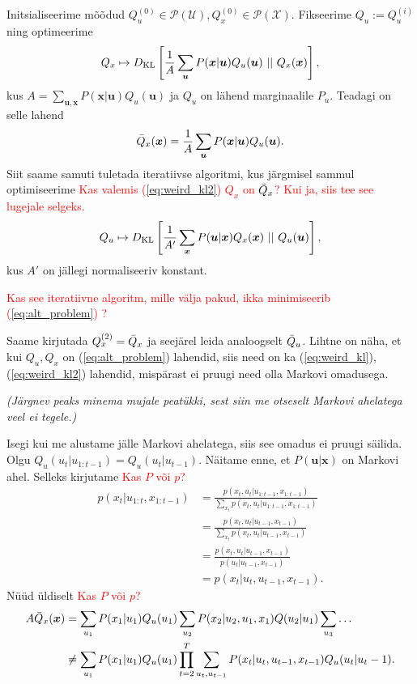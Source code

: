 Initsialiseerime mõõdud $Q_u^{(0)} \in \mathcal{P}(\mathcal{U}), Q_x^{(0)} \in \mathcal{P}(\mathcal{X})$. Fikseerime $Q_u := Q_u^{(i)}$ ning optimeerime \begin{equation}
    \label{eq:weird_kl}
    Q_x \mapsto D_{\mathrm{KL}}\left[\frac{1}{A}\sum_{\bm{u}} P(\bm{x} | \bm{u}) Q_u(\bm{u})\ ||\ Q_x(\bm{x})\right],
\end{equation}
kus $A = \sum_{\bm{u},\bm{x}} P(\bm{x}|\bm{u}) Q_u(\bm{u})$ ja $Q_u$ on lähend marginaalile $P_u$. Teadagi on selle lahend 
$$\Bar{Q}_x(\bm{x}) = \frac{1}{A}\sum_{\bm{u}} P(\bm{x}|\bm{u})Q_u(\bm{u}).$$ 
Siit saame samuti tuletada iteratiivse algoritmi, kus järgmisel sammul optimiseerime \textcolor{red}{Kas valemis (\ref{eq:weird_kl2}) $Q_x$ on $\Bar{Q}_x$? Kui ja, siis tee see lugejale selgeks. }
\begin{equation}
    \label{eq:weird_kl2}
    Q_u \mapsto D_{\mathrm{KL}}\left[\frac{1}{A'}\sum_{\bm{x}} P(\bm{u} | \bm{x}) Q_x(\bm{x})\ ||\ Q_u(\bm{u})\right],
\end{equation}
kus $A'$ on jällegi normaliseeriv konstant.

\textcolor{red}{Kas see iteratiivne algoritm, mille välja pakud, ikka minimiseerib (\ref{eq:alt_problem}) ?}



Saame kirjutada $Q_x^{(2)} = \Bar{Q}_x$ ja seejärel leida analoogselt $\Bar{Q}_u$. Lihtne on näha, et kui $Q_u, Q_x$ on (\ref{eq:alt_problem}) lahendid, siis need on ka (\ref{eq:weird_kl}), (\ref{eq:weird_kl2}) lahendid, mispärast ei pruugi need olla Markovi omadusega. 

\emph{(Järgnev peaks minema mujale peatükki, sest siin me otseselt Markovi ahelatega veel ei tegele.)}

Isegi kui me alustame jälle Markovi ahelatega, siis see omadus ei pruugi säilida. Olgu $Q_u(u_t |u_{1:t-1}) = Q_u(u_t|u_{t-1})$.  Näitame enne, et $P(\bm{u}|\bm{x})$ on Markovi ahel. Selleks kirjutame \textcolor{red}{Kas $P$ või $p$?}
\begin{align*}
    p(x_t | u_{1:t},x_{1:t-1}) &= \frac{p(x_t,u_t|u_{1:t-1},x_{1:t-1})}{\sum_{x_t}p(x_t,u_t|u_{1:t-1},x_{1:t-1})} \\ &= \frac{p(x_t,u_t|u_{t-1},x_{t-1})}{\sum_{x_t}p(x_t,u_t|u_{t-1},x_{t-1})} \\
    &= \frac{p(x_t,u_t|u_{t-1},x_{t-1})}{p(u_t|u_{t-1},x_{t-1})} \\
    &=  p(x_t|u_t,u_{t-1},x_{t-1}).
\end{align*}
Nüüd üldiselt \textcolor{red}{Kas $P$ või $p$?}
\begin{align*}
    A \Bar{Q}_x(\bm{x}) &=\sum_{u_1} P(x_1|u_1)Q_u(u_1) \sum_{u_2} P(x_2|u_2,u_1,x_1)Q(u_2|u_1)\sum_{u_3}\ldots \\
    &\ne \sum_{u_1}P(x_1|u_1) Q_u(u_1)\prod_{t=2}^T \sum_{u_t,u_{t-1}}P(x_t|u_t,u_{t-1},x_{t-1})Q_u(u_t|u_t-1{}).
\end{align*}

